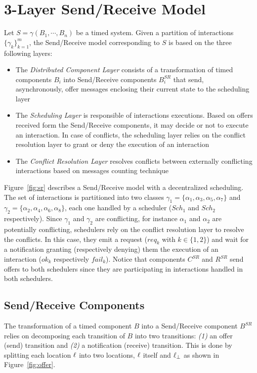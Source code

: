 \section{3-Layer Send/Receive Model}\label{sec:3.2}
Let $S=\gamma(B_1,\cdots,B_n)$ be a timed system. Given a partition of interactions
$\{\gamma_k\}^m_{k=1}$, the Send/Receive model corresponding to $S$ is based on the three
following layers:
\begin{itemize}
  \item The \emph{Distributed Component Layer} consists of a transformation of timed components
    $B_i$ into Send/Receive components $B_i^{SR}$ that send, asynchronously, offer messages 
    enclosing their current state to the scheduling layer 
  \item The \emph{Scheduling Layer} is responsible of interactions executions. Based on offers 
    received form the Send/Receive components, it may decide or not to execute an interaction.
    In case of conflicts, the scheduling layer relies on the conflict resolution layer to grant
    or deny the execution of an interaction
  \item The \emph{Conflict Resolution Layer} resolves conflicts between externally conflicting 
    interactions based on messages counting technique
\end{itemize}


\begin{example}
  Figure~\ref{fig:sr} describes a Send/Receive model with a decentralized scheduling. 
  The set of interactions is partitioned into two classes 
  $\gamma_1=\{\alpha_1,\alpha_3,\alpha_5,\alpha_7\}$ and
  $\gamma_2=\{\alpha_2,\alpha_4,\alpha_6,\alpha_8\}$, each one handled by a scheduler ($Sch_1$
  and $Sch_2$ respectively). Since $\gamma_1$ and $\gamma_2$ are conflicting, for instance
  $\alpha_1$ and $\alpha_2$ are potentially conflicting, schedulers rely on the conflict
  resolution layer to resolve the conflicts. In this case, they emit a request ($req_k$ with
  $k\in\{1,2\}$) and wait for a notification granting (respectively denying) them the execution
  of an interaction ($ok_k$ respectively $fail_k$).
  Notice that components $C^{SR}$ and $R^{SR}$ send offers to both schedulers since
  they are participating in interactions handled in both schedulers.
\end{example}
\subsection{Send/Receive Components}

The transformation of a timed component $B$ into a Send/Receive component $B^{SR}$ relies 
on decomposing each transition of $B$ into two transitions: \emph{(1)} an offer (send)
transition and \emph{(2)} a notification (receive) transition. This is done by splitting
each location $\ell$ into two locations, $\ell$ itself and $\ell_{\perp}$ as shown in 
Figure~\ref{fig:offer}.

